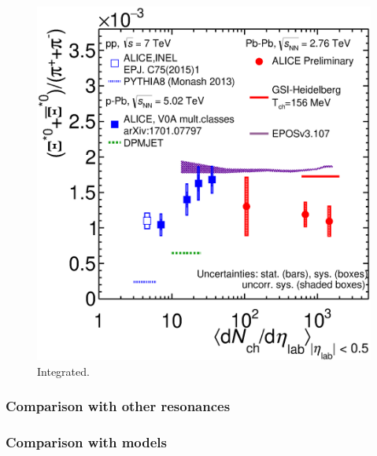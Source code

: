 \begin{figure}[htbp]
\begin{center}
\includegraphics[width=12.cm]{./Version1/FigChapter6/Ratio_XiStarToPion}
\caption{Integrated.}
\label{fig:xitopi}
\end{center}
\end{figure}

\subsubsection{Comparison with other resonances}
\subsubsection{Comparison with models}